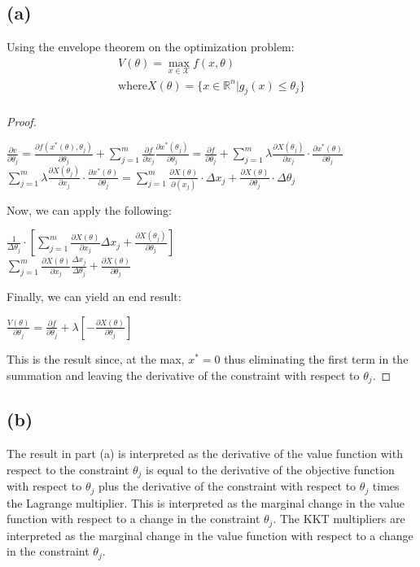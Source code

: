 \documentclass[10pt, a4paper]{article}
\begin{document}
  \subsection*{(a)}
    Using the envelope theorem on the optimization problem:
    \begin{gather*}
      V(\theta)=\max_{x\in\mathcal{X}} f(x,\theta) \\
      \text{where} X(\theta) = \{x\in\mathbb{R}^n|g_j(x)\leq\theta_j\} \\
    \end{gather*}
    \begin{proof}
      \begin{center}
        $\frac{\partial v}{\partial\theta_j} = \frac{\partial f(x^*(\theta),\theta_j)}{\partial\theta_j}
        +\sum\limits_{j=1}^m\frac{\partial f}{\partial x_j}\frac{\partial x^*(\theta_j)}{\partial\theta_j}
        = \frac{\partial f}{\partial\theta_j} + \sum\limits_{j=1}^m\lambda\frac{\partial X(\theta_j)}{\partial x_j}
        \cdot\frac{\partial x^*(\theta)}{\partial\theta_j}$ \\
        $\sum\limits_{j=1}^m\lambda\frac{\partial X(\theta_j)}{\partial x_j}\cdot\frac{\partial x^*(\theta)}{\partial\theta_j}
        = \sum\limits_{j=1}^m\frac{\partial X(\theta)}{\partial(x_j)}\cdot\Delta x_j + \frac{\partial X(\theta)}{\partial\theta_j}\cdot\Delta\theta_j$ \\
      \end{center}
      Now, we can apply the following:
      \begin{center}
        $\frac{1}{\Delta\theta_j}\cdot[\sum\limits_{j=1}^m\frac{\partial X(\theta)}{\partial x_j}\Delta x_j +
        \frac{\partial X(\theta_j)}{\partial\theta_j}]$ \\
        $\sum\limits_{j=1}^m\frac{\partial X(\theta)}{\partial x_j}\frac{\Delta x_j}{\Delta\theta_j} +
        \frac{\partial X(\theta)}{\partial\theta_j}$ \\
      \end{center}
      Finally, we can yield an end result:
      \begin{center}
        $\boxed{\frac{V(\theta)}{\partial\theta_j} = \frac{\partial f}{\partial \theta_j} + \lambda[-\frac{\partial X(\theta)}{\partial\theta_j}]}$
      \end{center}
      This is the result since, at the max, $x^*=0$ thus eliminating the first term in the summation and leaving the derivative of the
      constraint with respect to $\theta_j$.
    \end{proof}
  \subsection*{(b)}
    The result in part (a) is interpreted as the derivative of the value function with respect to the constraint $\theta_j$ is equal to the
    derivative of the objective function with respect to $\theta_j$ plus the derivative of the constraint with respect to $\theta_j$ times the
    Lagrange multiplier. This is interpreted as the marginal change in the value function with respect to a change in the constraint $\theta_j$.
    The KKT multipliers are interpreted as the marginal change in the value function with respect to a change in the constraint $\theta_j$.
\end{document}
